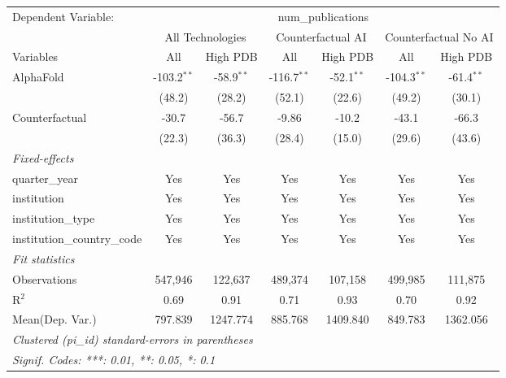 \begingroup
\centering
\begin{tabular}{lcccccc}
   \tabularnewline \midrule \midrule
   Dependent Variable: & \multicolumn{6}{c}{num\_publications}\\
 & \multicolumn{2}{c}{All Technologies} & \multicolumn{2}{c}{Counterfactual AI} & \multicolumn{2}{c}{Counterfactual No AI} \\
\cmidrule(lr){1-1}\cmidrule(lr){2-3} \cmidrule(lr){4-5} \cmidrule(lr){6-7}
Variables & \multicolumn{1}{c}{All} & \multicolumn{1}{c}{High PDB} & \multicolumn{1}{c}{All} & \multicolumn{1}{c}{High PDB} & \multicolumn{1}{c}{All} & \multicolumn{1}{c}{High PDB} \\
\cmidrule(lr){1-1}\cmidrule(lr){2-2} \cmidrule(lr){3-3} \cmidrule(lr){4-4} \cmidrule(lr){5-5} \cmidrule(lr){6-6} \cmidrule(lr){7-7}
   AlphaFold                    & -103.2$^{**}$ & -58.9$^{**}$ & -116.7$^{**}$ & -52.1$^{**}$ & -104.3$^{**}$ & -61.4$^{**}$\\   
                                & (48.2)        & (28.2)       & (52.1)        & (22.6)       & (49.2)        & (30.1)\\   
   Counterfactual               & -30.7         & -56.7        & -9.86         & -10.2        & -43.1         & -66.3\\   
                                & (22.3)        & (36.3)       & (28.4)        & (15.0)       & (29.6)        & (43.6)\\   
   \midrule
   \emph{Fixed-effects}\\
   quarter\_year                & Yes           & Yes          & Yes           & Yes          & Yes           & Yes\\  
   institution                  & Yes           & Yes          & Yes           & Yes          & Yes           & Yes\\  
   institution\_type            & Yes           & Yes          & Yes           & Yes          & Yes           & Yes\\  
   institution\_country\_code   & Yes           & Yes          & Yes           & Yes          & Yes           & Yes\\  
   \midrule
   \emph{Fit statistics}\\
   Observations                 & 547,946       & 122,637      & 489,374       & 107,158      & 499,985       & 111,875\\  
   R$^2$                        & 0.69          & 0.91         & 0.71          & 0.93         & 0.70          & 0.92\\  
Mean(Dep. Var.) & 797.839 & 1247.774 & 885.768 & 1409.840 & 849.783 & 1362.056 \\
   \midrule \midrule
   \multicolumn{7}{l}{\emph{Clustered (pi\_id) standard-errors in parentheses}}\\
   \multicolumn{7}{l}{\emph{Signif. Codes: ***: 0.01, **: 0.05, *: 0.1}}\\
\end{tabular}
\par\endgroup

